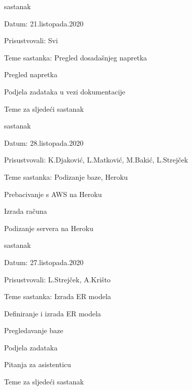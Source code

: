\begin{packed_enum}
			
			
			\item  sastanak
			\item[] \begin{packed_item}
				\item Datum: 21.listopada.2020
				\item Prisustvovali: Svi
				\item Teme sastanka: Pregled dosadašnjeg napretka
				\begin{packed_item}
				    \item Pregled napretka
					\item Podjela zadataka u vezi dokumentacije
					\item Teme za sljedeći sastanak
				\end{packed_item}
			\end{packed_item}
			
			
			\item  sastanak
			\item[] \begin{packed_item}
				\item Datum: 28.listopada.2020
				\item Prisustvovali: K.Djaković, L.Matković, M.Bakić, L.Strejček
				\item Teme sastanka: Podizanje baze, Heroku
				\begin{packed_item}
				    \item Prebacivanje s AWS na Heroku
					\item Izrada računa
					\item Podizanje servera na Heroku
				\end{packed_item}
			\end{packed_item}
			
			\item  sastanak
			\item[] \begin{packed_item}
				\item Datum: 27.listopada.2020
				\item Prisustvovali: L.Strejček, A.Krišto
				\item Teme sastanka: Izrada ER modela
				\begin{packed_item}
				    \item Definiranje i izrada ER modela
					\item Pregledavanje baze
					\item Podjela zadataka
					\item Pitanja za asistenticu
					\item Teme za sljedeći sastanak
				\end{packed_item}
			\end{packed_item}
			

\end{packed_enum}
